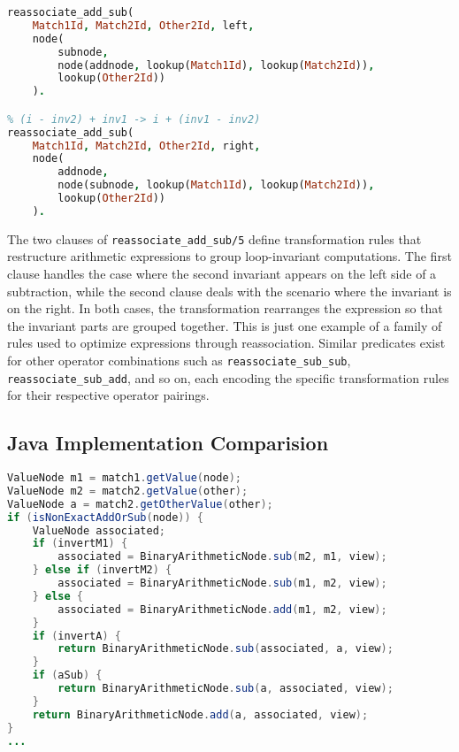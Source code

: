 \begin{lstlisting}[language=Prolog]
% (inv2 - i) + inv1 -> (inv1 + inv2) - i
reassociate_add_sub(
    Match1Id, Match2Id, Other2Id, left,
    node(
        subnode, 
        node(addnode, lookup(Match1Id), lookup(Match2Id)), 
        lookup(Other2Id))
    ).

% (i - inv2) + inv1 -> i + (inv1 - inv2)
reassociate_add_sub(
    Match1Id, Match2Id, Other2Id, right,
    node(
        addnode, 
        node(subnode, lookup(Match1Id), lookup(Match2Id)), 
        lookup(Other2Id))
    ).
\end{lstlisting}

The two clauses of \texttt{reassociate\_add\_sub/5} define transformation rules that restructure arithmetic expressions to group loop-invariant computations. The first clause handles the case where the second invariant appears on the left side of a subtraction, while the second clause deals with the scenario where the invariant is on the right. In both cases, the transformation rearranges the expression so that the invariant parts are grouped together. 
This is just one example of a family of rules used to optimize expressions through reassociation. Similar predicates exist for other operator combinations such as \texttt{reassociate\_sub\_sub}, \texttt{reassociate\_sub\_add}, and so on, each encoding the specific transformation rules for their respective operator pairings.

\subsection*{Java Implementation Comparision}

\begin{lstlisting}[language=Java]
ValueNode m1 = match1.getValue(node);
ValueNode m2 = match2.getValue(other);
ValueNode a = match2.getOtherValue(other);
if (isNonExactAddOrSub(node)) {
    ValueNode associated;
    if (invertM1) {
        associated = BinaryArithmeticNode.sub(m2, m1, view);
    } else if (invertM2) {
        associated = BinaryArithmeticNode.sub(m1, m2, view);
    } else {
        associated = BinaryArithmeticNode.add(m1, m2, view);
    }
    if (invertA) {
        return BinaryArithmeticNode.sub(associated, a, view);
    }
    if (aSub) {
        return BinaryArithmeticNode.sub(a, associated, view);
    }
    return BinaryArithmeticNode.add(a, associated, view);
}
...
\end{lstlisting}

